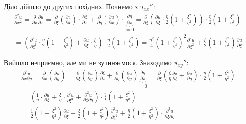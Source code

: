 \documentclass{hw_template}
\begin{document}
Діло дійшло до других похідних. Почнемо з $u_{xx}''$:
\begin{align*}
    \frac{\partial^2 u}{\partial x^2} = \frac{\partial}{\partial x} \frac{\partial u}{\partial x} = \frac{\partial}{\partial \xi}\left(\frac{\partial u}{\partial x}\right) \cdot \frac{\partial \xi}{\partial x} + \frac{\partial}{\partial \eta}\left(\frac{\partial u}{\partial x}\right) \cdot \underbrace{\frac{\partial \eta}{\partial x}}_{=0} = \frac{\partial}{\partial \xi}\left(\frac{\partial u}{\partial \xi} \cdot \frac{\eta}{2}\left(1 + \frac{\xi^2}{\eta^2}\right)\right) \cdot \frac{\eta}{2}\left(1+\frac{\xi^2}{\eta^2}\right) \\
    = \left(\frac{\partial^2 u}{\partial \xi^2} \cdot \frac{\eta}{2}\left(1+\frac{\xi^2}{\eta^2}\right) + \frac{\partial u}{\partial \xi} \cdot \frac{\xi}{\eta}\right) \cdot \frac{\eta}{2}\left(1+\frac{\xi^2}{\eta^2}\right) = \boxed{\frac{\eta^2}{4}\left(1+\frac{\xi^2}{\eta^2}\right)^2 \frac{\partial^2 u}{\partial \xi^2} + \frac{\xi}{2}\left(1 + \frac{\xi^2}{\eta^2}\right) \frac{\partial u}{\partial \xi}}
\end{align*}

Вийшло неприємно, але ми не зупиняємося. Знаходимо $u_{xy}''$:
\begin{align*}
    \frac{\partial^2 u}{\partial x\partial y} = \frac{\partial}{\partial x}\left(\frac{\partial u}{\partial y}\right) = \frac{\partial}{\partial \xi}\left(\frac{\partial u}{\partial y}\right)\frac{\partial \xi}{\partial x} + \frac{\partial}{\partial \eta}\left(\frac{\partial u}{\partial y}\right)\underbrace{\frac{\partial \eta}{\partial x}}_{=0} = \frac{\partial}{\partial \xi}\left(\frac{\xi}{\eta} \frac{\partial u}{\partial \xi} + \frac{\partial u}{\partial \eta}\right) \cdot \frac{\eta}{2}\left(1+\frac{\xi^2}{\eta^2}\right) \\
    = \left(\frac{1}{\eta} \cdot \frac{\partial u}{\partial \xi} + \frac{\xi}{\eta} \cdot \frac{\partial^2 u}{\partial \xi^2} + \frac{\partial^2 u}{\partial\xi\partial\eta}\right) \cdot \frac{\eta}{2}\left(1+\frac{\xi^2}{\eta^2}\right) \\ = \boxed{\frac{1}{2}\left(1+\frac{\xi^2}{\eta^2}\right) \frac{\partial u}{\partial \xi} + \frac{\xi}{2}\left(1+\frac{\xi^2}{\eta^2}\right) \frac{\partial^2 u}{\partial \xi^2} + \frac{\eta}{2}\left(1+\frac{\xi^2}{\eta^2}\right) \cdot \frac{\partial^2 u}{\partial \xi\partial\eta}}
\end{align*}
\end{document}
